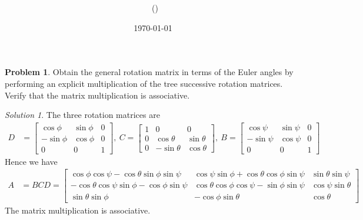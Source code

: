 \documentclass[twoside,11pt]{article}
\title{{\lms \Code \ \Ass}}
\author{\lms \name \ (\href{mailto:\mail}{\mail})}
\date{\sffamily \today}
\makeatletter
\newcommand{\lms}{\fontfamily{lmss}\selectfont} %
\theoremstyle{definition}
\newtheorem{problem}{\lms Problem}
\theoremstyle{remark}
\newtheorem*{remark}{Remark}
\newtheorem*{solution}{Solution}
\renewcommand{\maketitle}{\bgroup\setlength{\parindent}{0pt}
\begin{flushleft}
  \textbf{\Large\@title}

  \@author
\end{flushleft}\egroup
}
\makeatother
\begin{document}
\maketitle
\thispagestyle{title}


\begin{problem}
Obtain the general rotation matrix in terms of the Euler angles by performing
an explicit multiplication of the tree successive rotation matrices.
Verify that the matrix multiplication is associative.
\end{problem}
\begin{solution} 
The three rotation matrices are
\begin{align*}
    D &= 
    \begin{bmatrix}
        \cos\phi & \sin\phi & 0\\
        -\sin\phi & \cos\phi & 0\\
        0 & 0 & 1
    \end{bmatrix},~
    C = 
    \begin{bmatrix}
        1 & 0 & 0\\
        0 & \cos\theta & \sin\theta \\
        0 & -\sin\theta & \cos\theta
    \end{bmatrix},~
    B = 
    \begin{bmatrix}
        \cos\psi & \sin\psi & 0\\
        -\sin\psi & \cos\psi & 0\\
        0 & 0 & 1
    \end{bmatrix}
\end{align*}
Hence we have
\begin{align*}
    A &= BCD = 
    \begin{bmatrix}
        \cos\phi\cos\psi - \cos\theta\sin\phi\sin\psi & 
        \cos\psi\sin\phi + \cos\theta\cos\phi\sin\psi &
        \sin\theta\sin\psi\\
        -\cos\theta\cos\psi\sin\phi - \cos\phi\sin\psi &
        \cos\theta\cos\phi\cos\psi - \sin\phi\sin\psi &
        \cos\psi\sin\theta\\
        \sin\theta\sin\phi &
        -\cos\phi\sin\theta &
        \cos\theta
    \end{bmatrix}
\end{align*}
The matrix multiplication is associative.
\end{solution}
\end{document}
